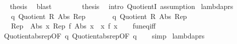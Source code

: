 \begin{isabellebody}
\ \isamarkupfalse%
\ {\isacharquery}{\kern0pt}thesis\ \isamarkupfalse%
\ blast\isanewline
\ \ \isamarkupfalse%
\isanewline
\ \ \isamarkupfalse%
\ \isamarkupfalse%
\ {\isacharquery}{\kern0pt}thesis\ \isamarkupfalse%
\ {\isacharparenleft}{\kern0pt}intro\ Quotient{}I{\isacharparenright}{\kern0pt}\ {\isacharparenleft}{\kern0pt}assumption{\isacharplus}{\kern0pt}{\isacharparenright}{\kern0pt}\isanewline
{}\isamarkupfalse%
%
\endisatagproof
{\isafoldproof}%
%
\isadelimproof
\isanewline
%
\endisadelimproof
\isanewline
{}\isamarkupfalse%
\ lambda{\isacharunderscore}{\kern0pt}prs{\isacharcolon}{\kern0pt}\isanewline
\ \ \ q{}{\isacharcolon}{\kern0pt}\ {\isachardoublequoteopen}Quotient{}\ R{}\ Abs{}\ Rep{}{\isachardoublequoteclose}\isanewline
\ \ \ \ \ \ \ q{}{\isacharcolon}{\kern0pt}\ {\isachardoublequoteopen}Quotient{}\ R{}\ Abs{}\ Rep{}{\isachardoublequoteclose}\isanewline
\ \ \ {\isachardoublequoteopen}{\isacharparenleft}{\kern0pt}Rep{}\ {\isacharminus}{\kern0pt}{\isacharminus}{\kern0pt}{\isacharminus}{\kern0pt}{\isachargreater}{\kern0pt}\ Abs{}{\isacharparenright}{\kern0pt}\ {\isacharparenleft}{\kern0pt}{\isasymlambda}x{\isachardot}{\kern0pt}\ Rep{}\ {\isacharparenleft}{\kern0pt}f\ {\isacharparenleft}{\kern0pt}Abs{}\ x{\isacharparenright}{\kern0pt}{\isacharparenright}{\kern0pt}{\isacharparenright}{\kern0pt}\ {\isacharequal}{\kern0pt}\ {\isacharparenleft}{\kern0pt}{\isasymlambda}x{\isachardot}{\kern0pt}\ f\ x{\isacharparenright}{\kern0pt}{\isachardoublequoteclose}\isanewline
%
\isadelimproof
\ \ %
\endisadelimproof
%
\isatagproof
{}\isamarkupfalse%
\ fun{\isacharunderscore}{\kern0pt}eq{\isacharunderscore}{\kern0pt}iff\isanewline
\ \ \isamarkupfalse%
\ Quotient{}{\isacharunderscore}{\kern0pt}abs{\isacharunderscore}{\kern0pt}rep{\isacharbrackleft}{\kern0pt}OF\ q{}{\isacharbrackright}{\kern0pt}\ Quotient{}{\isacharunderscore}{\kern0pt}abs{\isacharunderscore}{\kern0pt}rep{\isacharbrackleft}{\kern0pt}OF\ q{}{\isacharbrackright}{\kern0pt}\isanewline
\ \ \isamarkupfalse%
\ simp%
\endisatagproof
{\isafoldproof}%
%
\isadelimproof
\isanewline
%
\endisadelimproof
\isanewline
{}\isamarkupfalse%
\ lambda{\isacharunderscore}{\kern0pt}prs{}{\isacharcolon}{\kern0pt}\isanewline

\end{isabellebody}
